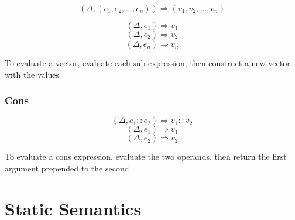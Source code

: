 \documentclass[titlepage]{article}
\begin{document}
$$(\Delta, (e_1, e_2, ..., e_n)) \Rightarrow (v_1, v_2, ..., v_n)$$

\noindent\makebox[\linewidth]{\rule{2.1in}{0.4pt}}
$$(\Delta, e_1) \Rightarrow v_1$$
$$(\Delta, e_2) \Rightarrow v_2$$
$$\dots$$
$$(\Delta, e_n) \Rightarrow v_n$$


To evaluate a vector, evaluate each sub expression, then construct a new vector with the values

\subsubsection{Cons}

$$(\Delta, e_1 :: e_2) \Rightarrow v_1 :: v_2$$
\noindent\makebox[\linewidth]{\rule{1.4in}{0.4pt}}
$$(\Delta, e_1) \Rightarrow v_1$$
$$(\Delta, e_2) \Rightarrow v_2$$

To evaluate a cons expression, evaluate the two operands, then return the first argument prepended to the second



\section{Static Semantics}
\end{document}
